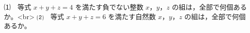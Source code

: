 ⑴　等式 $x+y+z=4$ を満たす負でない整数 $x$，$y$，$z$ の組は，全部で何個あるか。<br>
⑵　等式 $x+y+z=6$ を満たす自然数 $x$，$y$，$z$ の組は，全部で何個あるか。
